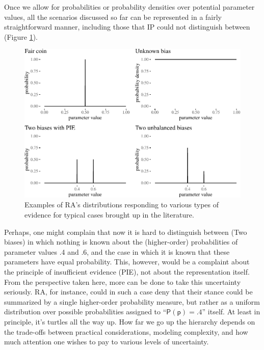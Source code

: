 \documentclass[
  10pt,
  dvipsnames,enabledeprecatedfontcommands]{scrartcl}
\begin{document}
Once we allow for probabilities or probability densities over potential
parameter values, all the scenarios discussed so far can be represented
in a fairly straightforward manner, including those that IP could not
distinguish between (Figure \ref{fig:evidenceResponse}).

\begin{figure}


\begin{center}\includegraphics[width=1\linewidth]{impreciseEpistemicFINAL_files/figure-latex/fig:evidenceResponse-1} \end{center}
\caption{Examples of RA's distributions responding to various types of evidence for typical cases brought up in the literature.}


\label{fig:evidenceResponse}
\end{figure}

Perhaps, one might complain that now it is hard to distinguish between
(Two biases) in which nothing is known about the (higher-order)
probabilities of parameter values .4 and .6, and the case in which it is
known that these parameters have equal probability. This, however, would
be a complaint about the principle of insufficient evidence (PIE), not
about the representation itself. From the perspective taken here, more
can be done to take this uncertainty seriously. RA, for instance, could
in such a case deny that their stance could be summarized by a single
higher-order probability measure, but rather as a uniform distribution
over possible probabilities assigned to ``\(\mathsf{P(p) = .4}\)''
itself. At least in principle, it's turtles all the way up. How far we
go up the hierarchy depends on the trade-offs between practical
considerations, modeling complexity, and how much attention one wishes
to pay to various levels of uncertainty.
\end{document}
